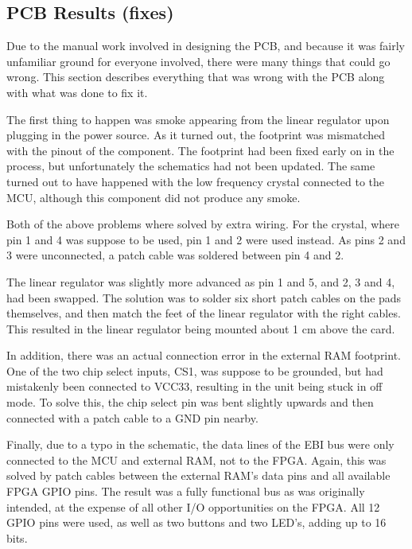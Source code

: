 
\subsection{PCB Results (fixes)}

Due to the manual work involved in designing the PCB, and because it was fairly
unfamiliar ground for everyone involved, there were many things that could go
wrong. This section describes everything that was wrong with the PCB along with
what was done to fix it.

The first thing to happen was smoke appearing from the linear regulator upon
plugging in the power source. As it turned out, the footprint was mismatched
with the pinout of the component. The footprint had been fixed early on in the
process, but unfortunately the schematics had not been updated. The same turned
out to have happened with the low frequency crystal connected to the MCU,
although this component did not produce any smoke.

Both of the above problems where solved by extra wiring. For the crystal, where
pin 1 and 4 was suppose to be used, pin 1 and 2 were used instead. As pins 2 and
3 were unconnected, a patch cable was soldered between pin 4 and 2.




The linear regulator was slightly more advanced as pin 1 and 5, and 2, 3 and 4,
had been swapped. The solution was to solder six short patch cables on the pads
themselves, and then match the feet of the linear regulator with the right
cables. This resulted in the linear regulator being mounted about 1 cm above the
card.




In addition, there was an actual connection error in the external RAM footprint.
One of the two chip select inputs, CS1, was suppose to be grounded, but had
mistakenly been connected to VCC33, resulting in the unit being stuck in off
mode. To solve this, the chip select pin was bent slightly upwards and then
connected with a patch cable to a GND pin nearby. 

Finally, due to a typo in the schematic, the data lines of the EBI bus were only
connected to the MCU and external RAM, not to the FPGA. Again, this was solved
by patch cables between the external RAM's data pins and all available FPGA GPIO
pins. The result was a fully functional bus as was originally intended, at the
expense of all other I/O opportunities on the FPGA. All 12 GPIO pins were used,
as well as two buttons and two LED's, adding up to 16 bits.


